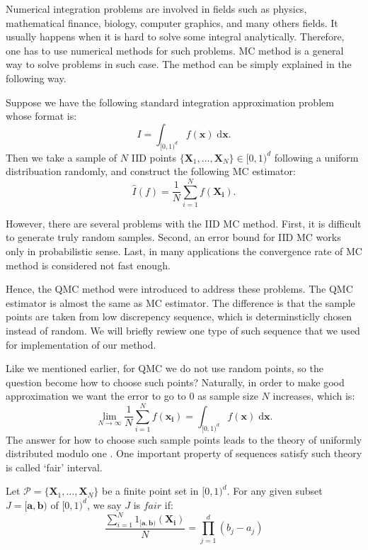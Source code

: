 
Numerical integration problems are involved in fields such as physics, mathematical finance, biology, computer graphics, and many others fields. 
It usually happens when it is hard to solve some integral analytically. Therefore, one has to use numerical methods for such problems.  
MC method is a general way to solve problems in such case\cite{fishman2013monte}. The method can be simply explained in the following way. 

Suppose we have the following standard integration approximation problem whose format is: 
\begin{equation}
    \label{eq:setup}
    I= \int_{[0,1)^d}f(\mathbf{x})\;\textrm{d}\mathbf{x}.
\end{equation}
Then we take a sample of $N$ IID points $\{\mathbf{X}_1,\dots, \mathbf{X}_N\}\in [0,1)^d$ following a uniform distribuation randomly, and construct the following MC estimator:
\[
    \hat{I}(f)=\frac{1}{N}\sum_{i=1}^{N}f(\mathbf{X_i}).
\]

However, there are several problems with the IID MC method\cite{niederreiter2010quasi}.
First, it is difficult to generate truly random samples. Second, an error bound for IID MC works only in probabilistic sense. 
Last, in many applications the convergence rate of MC method is considered not fast enough. 

Hence, the QMC method were introduced to address these problems. 
The QMC estimator is almost the same as MC estimator. 
The difference is that the sample points are taken from low discrepency sequence, which is determinsticlly chosen instead of random.   
We will briefly rewiew one type of such sequence that we used for implementation of our method. 

\newpage


Like we mentioned earlier, for QMC we do not use random points, so the question become how to choose such points?  
Naturally, in order to make good approximation we want the error to go to $0$ as sample size $N$ increases, which is:
\[
    \lim_{N\to\infty}\frac{1}{N}\sum_{i=1}^{N}f(\mathbf{x_i})=\int_{[0,1)^d}f(\mathbf{x})\;\textrm{d}\mathbf{x}.
\]
The answer for how to choose such sample points leads to the theory of uniformly distributed modulo one \cite{dick2010digital}. One important property of sequences satisfy such theory is called `fair' interval.
\theoremstyle{definition}
\begin{definition}{}
Let $\mathscr{P} =\{\mathbf{X}_1,\dots,\mathbf{X}_N\}$ be a finite point set in $[0, 1)^d$.
            For any given subset $J=[\mathbf{a},\mathbf{b})$ of $[0, 1)^d$, we say $J$ is $\textit{fair}$ if:  
    \[
        \frac{\sum_{i=1}^{N}1_{[\mathbf{a},\mathbf{b})}(\mathbf{X_i})}{N}
            =\prod_{j=1}^{d}(b_j-a_j)
                    \]
\end{definition}

